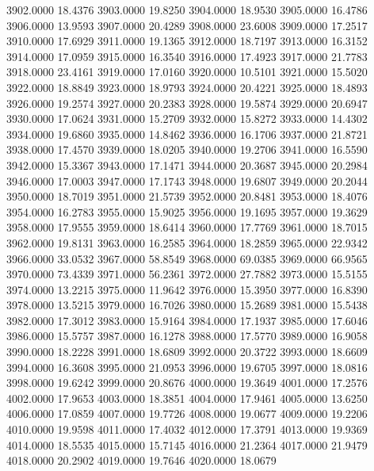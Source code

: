 3902.0000     18.4376
3903.0000     19.8250
3904.0000     18.9530
3905.0000     16.4786
3906.0000     13.9593
3907.0000     20.4289
3908.0000     23.6008
3909.0000     17.2517
3910.0000     17.6929
3911.0000     19.1365
3912.0000     18.7197
3913.0000     16.3152
3914.0000     17.0959
3915.0000     16.3540
3916.0000     17.4923
3917.0000     21.7783
3918.0000     23.4161
3919.0000     17.0160
3920.0000     10.5101
3921.0000     15.5020
3922.0000     18.8849
3923.0000     18.9793
3924.0000     20.4221
3925.0000     18.4893
3926.0000     19.2574
3927.0000     20.2383
3928.0000     19.5874
3929.0000     20.6947
3930.0000     17.0624
3931.0000     15.2709
3932.0000     15.8272
3933.0000     14.4302
3934.0000     19.6860
3935.0000     14.8462
3936.0000     16.1706
3937.0000     21.8721
3938.0000     17.4570
3939.0000     18.0205
3940.0000     19.2706
3941.0000     16.5590
3942.0000     15.3367
3943.0000     17.1471
3944.0000     20.3687
3945.0000     20.2984
3946.0000     17.0003
3947.0000     17.1743
3948.0000     19.6807
3949.0000     20.2044
3950.0000     18.7019
3951.0000     21.5739
3952.0000     20.8481
3953.0000     18.4076
3954.0000     16.2783
3955.0000     15.9025
3956.0000     19.1695
3957.0000     19.3629
3958.0000     17.9555
3959.0000     18.6414
3960.0000     17.7769
3961.0000     18.7015
3962.0000     19.8131
3963.0000     16.2585
3964.0000     18.2859
3965.0000     22.9342
3966.0000     33.0532
3967.0000     58.8549
3968.0000     69.0385
3969.0000     66.9565
3970.0000     73.4339
3971.0000     56.2361
3972.0000     27.7882
3973.0000     15.5155
3974.0000     13.2215
3975.0000     11.9642
3976.0000     15.3950
3977.0000     16.8390
3978.0000     13.5215
3979.0000     16.7026
3980.0000     15.2689
3981.0000     15.5438
3982.0000     17.3012
3983.0000     15.9164
3984.0000     17.1937
3985.0000     17.6046
3986.0000     15.5757
3987.0000     16.1278
3988.0000     17.5770
3989.0000     16.9058
3990.0000     18.2228
3991.0000     18.6809
3992.0000     20.3722
3993.0000     18.6609
3994.0000     16.3608
3995.0000     21.0953
3996.0000     19.6705
3997.0000     18.0816
3998.0000     19.6242
3999.0000     20.8676
4000.0000     19.3649
4001.0000     17.2576
4002.0000     17.9653
4003.0000     18.3851
4004.0000     17.9461
4005.0000     13.6250
4006.0000     17.0859
4007.0000     19.7726
4008.0000     19.0677
4009.0000     19.2206
4010.0000     19.9598
4011.0000     17.4032
4012.0000     17.3791
4013.0000     19.9369
4014.0000     18.5535
4015.0000     15.7145
4016.0000     21.2364
4017.0000     21.9479
4018.0000     20.2902
4019.0000     19.7646
4020.0000     18.0679
